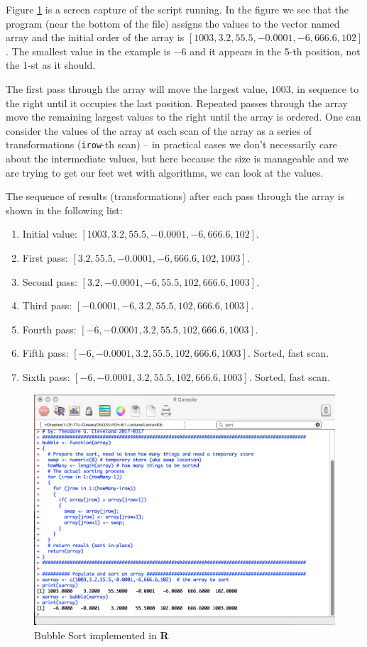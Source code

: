 Figure \ref{fig:MyBubbleSort.jpg} is a screen capture of the script running.   
In the figure we see that the program (near the bottom of the file) assigns the values to the vector named array and the initial order of the array is $[1003,3.2,55.5,-0.0001,-6,666.6,102]$.   
The smallest value in the example is $-6$ and it appears in the 5-th position, not the 1-st as it should.  

The first pass through the array will move the largest value, $1003$, in sequence to the right until it occupies the last position.
Repeated passes through the array move the remaining largest values to the right until the array is ordered.  
One can consider the values of the array at each scan of the array as a series of transformations (\texttt{irow}-th scan) -- in practical cases we don't necessarily care about the intermediate values, but here because the size is manageable and we are trying to get our feet wet with algorithms, we can look at the values.

The sequence of results (transformations) after each pass through the array is shown in the following list:
\begin{enumerate}
\item Initial value: $[1003,3.2,55.5,-0.0001,-6,666.6,102]$.
\item First pass: $[3.2,55.5,-0.0001,-6,666.6,102,1003]$.
\item Second pass: $[3.2,-0.0001,-6,55.5,102,666.6,1003]$.
\item Third pass: $[-0.0001,-6,3.2,55.5,102,666.6,1003]$.
\item Fourth pass: $[-6,-0.0001,3.2,55.5,102,666.6,1003]$.
\item Fifth pass:  $[-6,-0.0001,3.2,55.5,102,666.6,1003]$. Sorted, fast scan.
\item Sixth pass: $[-6,-0.0001,3.2, 55.5,102,666.6,1003]$.  Sorted, fast scan.
\end{enumerate}
\begin{figure}[h!] %
   \centering
   \includegraphics[width=6in]{./3-Sorting/MyBubbleSort.jpg} 
   \caption{Bubble Sort implemented in \textbf{R}}
   \label{fig:MyBubbleSort.jpg}
\end{figure}


